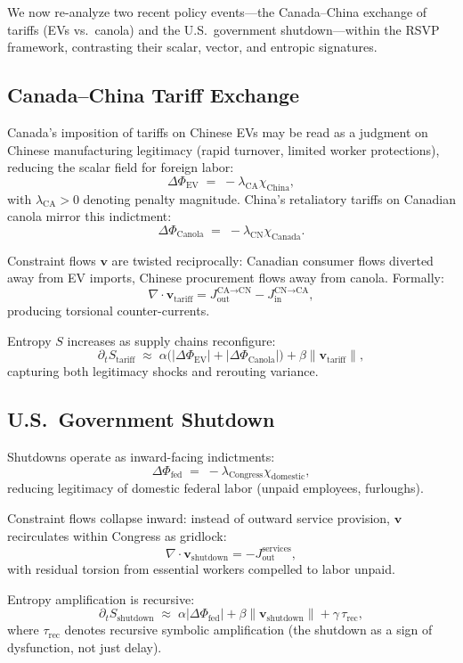 \documentclass{article}
\begin{document}
We now re-analyze two recent policy events---the Canada--China exchange of 
tariffs (EVs vs.\ canola) and the U.S.\ government shutdown---within the RSVP 
framework, contrasting their scalar, vector, and entropic signatures.

\subsection{Canada--China Tariff Exchange}
Canada’s imposition of tariffs on Chinese EVs may be read as a judgment on 
Chinese manufacturing legitimacy (rapid turnover, limited worker protections), 
reducing the scalar field for foreign labor:
\[
\Delta \Phi_{\text{EV}} \;=\; - \lambda_{\text{CA}} \chi_{\text{China}},
\]
with $\lambda_{\text{CA}}>0$ denoting penalty magnitude.
China’s retaliatory tariffs on Canadian canola mirror this indictment:
\[
\Delta \Phi_{\text{Canola}} \;=\; - \lambda_{\text{CN}} \chi_{\text{Canada}}.
\]

Constraint flows $\mathbf{v}$ are twisted reciprocally: Canadian consumer flows 
diverted away from EV imports, Chinese procurement flows away from canola. 
Formally:
\[
\nabla \cdot \mathbf{v}_{\text{tariff}} 
= J_{\text{out}}^{\text{CA}\to\text{CN}} 
- J_{\text{in}}^{\text{CN}\to\text{CA}} ,
\]
producing torsional counter-currents.

Entropy $S$ increases as supply chains reconfigure:
\[
\partial_t S_{\text{tariff}} \;\approx\;
\alpha \big( |\Delta \Phi_{\text{EV}}| + |\Delta \Phi_{\text{Canola}}| \big)
+ \beta \|\mathbf{v}_{\text{tariff}}\|,
\]
capturing both legitimacy shocks and rerouting variance.

\subsection{U.S.\ Government Shutdown}
Shutdowns operate as inward-facing indictments: 
\[
\Delta \Phi_{\text{fed}} \;=\; - \lambda_{\text{Congress}} \chi_{\text{domestic}},
\]
reducing legitimacy of domestic federal labor (unpaid employees, furloughs). 

Constraint flows collapse inward: instead of outward service provision, 
$\mathbf{v}$ recirculates within Congress as gridlock:
\[
\nabla \cdot \mathbf{v}_{\text{shutdown}} 
= - J_{\text{out}}^{\text{services}} ,
\]
with residual torsion from essential workers compelled to labor unpaid.

Entropy amplification is recursive:
\[
\partial_t S_{\text{shutdown}} \;\approx\;
\alpha |\Delta \Phi_{\text{fed}}| + \beta \|\mathbf{v}_{\text{shutdown}}\|
+ \gamma \,\tau_{\text{rec}},
\]
where $\tau_{\text{rec}}$ denotes recursive symbolic amplification
(the shutdown as a sign of dysfunction, not just delay).
\end{document}
